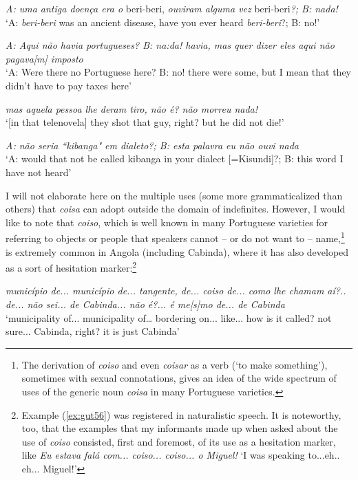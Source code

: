 \documentclass[output=paper,colorlinks,citecolor=brown]{langscibook}
\begin{document}
\ea \label{ex:gut52}
    \textit{A: uma antiga doença era o} beri-beri, \textit{ouviram alguma vez} beri-beri\textit{?; B: nada!}\\
    ‘A: \textit{beri-beri} was an ancient disease, have you ever heard \textit{beri-beri}?; B: no!’  
  
    \ex \label{ex:gut53}
    \textit{A: Aqui não havia portugueses? B: na:da! havia, mas quer dizer eles aqui não pagava[m] imposto }\\
    ‘A: Were there no Portuguese here? B: no! there were some, but I mean that they didn’t have to pay taxes here’
    
    \ex \label{ex:gut54}
    \textit{mas aquela pessoa lhe deram tiro, não é? não morreu nada! }\\
    ‘[in that telenovela] they shot that guy, right? but he did not die!’
    
    \ex \label{ex:gut55} 
    \textit{A: não seria ``kibanga" em dialeto?; B: esta palavra eu não ouvi nada }\\
    ‘A: would that not be called kibanga in your dialect [=Kisundi]?; B: this word I have not heard’
\z

I will not elaborate here on the multiple uses (some more grammaticalized than others) that \textit{coisa} can adopt outside the domain of indefinites. However, I would like to note that \textit{coiso}, which is well known in many Portuguese varieties for referring to objects or people that speakers cannot -- or do not want to -- name,\footnote{The derivation of \textit{coiso} and even \textit{coisar} as a verb (‘to make something’), sometimes with sexual connotations, gives an idea of the wide spectrum of uses of the generic noun \textit{coisa} in many Portuguese varieties. } is extremely common in Angola (including Cabinda), where it has also developed as a sort of hesitation marker:\footnote{Example (\ref{ex:gut56}) was registered in naturalistic speech. It is noteworthy, too, that the examples that my informants made up when asked about the use of \textit{coiso} consisted, first and foremost, of its use as a hesitation marker, like \textit{Eu estava falá com... coiso... coiso... o Miguel!} ‘I was speaking to...eh.. eh... Miguel!’}

\ea \label{ex:gut56}
    \textit{município de... município de... tangente, de... coiso de... como lhe chamam aí?.. de... não sei... de Cabinda... não é?... é me[s]mo de... de Cabinda}\\
    ‘municipality of... municipality of… bordering on... like... how is it called? not sure... Cabinda, right? it is just Cabinda’
\z
\end{document}
